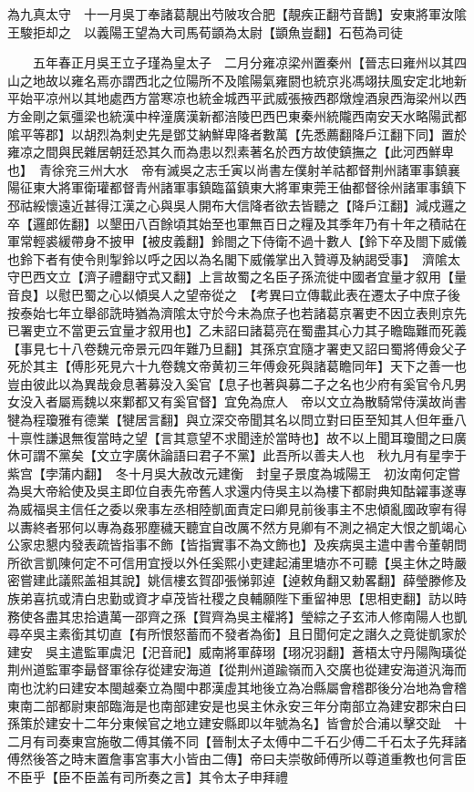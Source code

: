 為九真太守　十一月吳丁奉諸葛靚出芍陂攻合肥【靚疾正翻芍音鵲】安東將軍汝隂王駿拒却之　以義陽王望為大司馬荀顗為太尉【顗魚豈翻】石苞為司徒

　　五年春正月吳王立子瑾為皇太子　二月分雍凉梁州置秦州【晉志曰雍州以其四山之地故以雍名焉亦謂西北之位陽所不及隂陽氣雍閼也統京兆馮翊扶風安定北地新平始平凉州以其地處西方當寒凉也統金城西平武威張掖西郡燉煌酒泉西海梁州以西方金剛之氣彊梁也統漢中梓潼廣漢新都涪陵巴西巴東秦州統隴西南安天水略陽武都隂平等郡】以胡烈為刺史先是鄧艾納鮮卑降者數萬【先悉薦翻降戶江翻下同】置於雍凉之間與民雜居朝廷恐其久而為患以烈素著名於西方故使鎮撫之【此河西鮮卑也】　青徐兖三州大水　帝有滅吳之志壬寅以尚書左僕射羊祜都督荆州諸軍事鎮襄陽征東大將軍衛瓘都督青州諸軍事鎮臨菑鎮東大將軍東莞王伷都督徐州諸軍事鎮下邳祜綏懷遠近甚得江漢之心與吳人開布大信降者欲去皆聽之【降戶江翻】減戍邏之卒【邏郎佐翻】以墾田八百餘頃其始至也軍無百日之糧及其季年乃有十年之積祜在軍常輕裘緩帶身不披甲【被皮義翻】鈴閤之下侍衛不過十數人【鈴下卒及閤下威儀也鈴下者有使令則掣鈴以呼之因以為名閣下威儀掌出入贊導及納謁受事】　濟隂太守巴西文立【濟子禮翻守式又翻】上言故蜀之名臣子孫流徙中國者宜量才叙用【量音良】以慰巴蜀之心以傾吳人之望帝從之　【考異曰立傳載此表在遷太子中庶子後按泰始七年立舉郤詵時猶為濟隂太守於今未為庶子也若諸葛京署吏不因立表則京先已署吏立不當更云宜量才叙用也】乙未詔曰諸葛亮在蜀盡其心力其子瞻臨難而死義【事見七十八卷魏元帝景元四年難乃旦翻】其孫京宜隨才署吏又詔曰蜀將傅僉父子死於其主【傅肜死見六十九卷魏文帝黄初三年傅僉死與諸葛瞻同年】天下之善一也豈由彼此以為異哉僉息著募没入奚官【息子也著與募二子之名也少府有奚官令凡男女没入者屬焉魏以來鄴都又有奚官督】宜免為庶人　帝以文立為散騎常侍漢故尚書犍為程瓊雅有德業【犍居言翻】與立深交帝聞其名以問立對曰臣至知其人但年垂八十禀性謙退無復當時之望【言其意望不求聞逹於當時也】故不以上聞耳瓊聞之曰廣休可謂不黨矣【文立字廣休論語曰君子不黨】此吾所以善夫人也　秋九月有星孛于紫宫【孛蒲内翻】　冬十月吳大赦改元建衡　封皇子景度為城陽王　初汝南何定嘗為吳大帝給使及吳主即位自表先帝舊人求還内侍吳主以為樓下都尉典知酤糴事遂專為威福吳主信任之委以衆事左丞相陸凱面責定曰卿見前後事主不忠傾亂國政寧有得以夀終者邪何以專為姦邪塵穢天聽宜自改厲不然方見卿有不測之禍定大恨之凱竭心公家忠懇内發表疏皆指事不飾【皆指實事不為文飾也】及疾病吳主遣中書令董朝問所欲言凱陳何定不可信用宜授以外任奚熙小吏建起浦里塘亦不可聽【吳主休之時嚴密嘗建此議熙盖祖其說】姚信樓玄賀卲張悌郭逴【逴敕角翻又勅畧翻】薛瑩滕修及族弟喜抗或清白忠勤或資才卓茂皆社稷之良輔願陛下重留神思【思相吏翻】訪以時務使各盡其忠拾遺萬一邵齊之孫【賀齊為吳主權將】瑩綜之子玄沛人修南陽人也凱尋卒吳主素銜其切直【有所恨怒蓄而不發者為銜】且日聞何定之譖久之竟徙凱家於建安　吳主遣監軍虞汜【汜音祀】威南將軍薛珝【珝况羽翻】蒼梧太守丹陽陶璜從荆州道監軍李朂督軍徐存從建安海道【從荆州道踰嶺而入交廣也從建安海道汎海而南也沈約曰建安本閩越秦立為閩中郡漢虛其地後立為冶縣屬會稽郡後分冶地為會稽東南二部都尉東部臨海是也南部建安是也吳主休永安三年分南部立為建安郡宋白曰孫策於建安十二年分東候官之地立建安縣即以年號為名】皆會於合浦以擊交趾　十二月有司奏東宫施敬二傅其儀不同【晉制太子太傅中二千石少傅二千石太子先拜諸傅然後答之時末置詹事宮事大小皆由二傳】帝曰夫崇敬師傅所以尊道重教也何言臣不臣乎【臣不臣盖有司所奏之言】其令太子申拜禮

